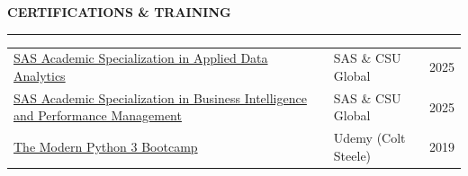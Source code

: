\documentclass[letterpaper, 11pt]{article}
\newcommand{\rsection}[1]{%
  \vspace{8pt}%
  {\large\textbf{#1}}\\[-5pt]%
  \rule{\textwidth}{0.5pt}%
  \vspace{3pt}%
}
\begin{document}
\rsection{CERTIFICATIONS \& TRAINING}

\begin{tabularx}{\textwidth}{@{}>{\raggedright\arraybackslash}X l r@{}}
  \href{https://www.credly.com/badges/cb4b59be-038c-4bbc-9b98-e30f139395ef/linked_in_profile}%
       {SAS Academic Specialization in Applied Data Analytics}
  & SAS \& CSU Global & 2025 \\[2pt]
  \href{https://www.credly.com/badges/0bed96d9-6f1f-4cc3-9757-bc06ef5f74fe/linked_in_profile}%
       {SAS Academic Specialization in Business Intelligence and Performance Management}
  & SAS \& CSU Global & 2025 \\[2pt]
  \href{https://ude.my/UC-0336PVRS}{The Modern Python 3 Bootcamp}
  & Udemy (Colt Steele) & 2019 \\
\end{tabularx}
\end{document}
